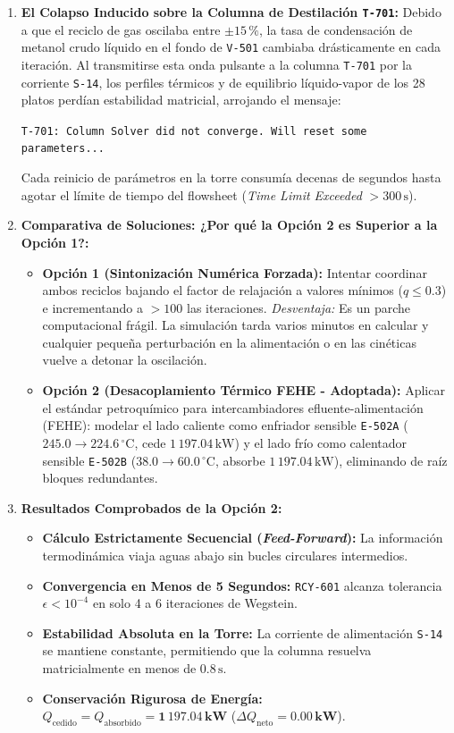 \documentclass[11pt,a4paper]{article}
\begin{document}
\begin{enumerate}
    \item \textbf{El Colapso Inducido sobre la Columna de Destilación \texttt{T-701}:}  
    Debido a que el reciclo de gas oscilaba entre $\pm 15\,\%$, la tasa de condensación de metanol crudo líquido en el fondo de \texttt{V-501} cambiaba drásticamente en cada iteración. Al transmitirse esta onda pulsante a la columna \texttt{T-701} por la corriente \texttt{S-14}, los perfiles térmicos y de equilibrio líquido-vapor de los 28 platos perdían estabilidad matricial, arrojando el mensaje:
    \begin{center}
        \texttt{T-701: Column Solver did not converge. Will reset some parameters...}
    \end{center}
    Cada reinicio de parámetros en la torre consumía decenas de segundos hasta agotar el límite de tiempo del flowsheet (\textit{Time Limit Exceeded} $>300\,\text{s}$).

    \item \textbf{Comparativa de Soluciones: ¿Por qué la Opción 2 es Superior a la Opción 1?:}  
    \begin{itemize}
        \item \textbf{Opción 1 (Sintonización Numérica Forzada):} Intentar coordinar ambos reciclos bajando el factor de relajación a valores mínimos ($q \le 0.3$) e incrementando a $>100$ las iteraciones. \textit{Desventaja:} Es un parche computacional frágil. La simulación tarda varios minutos en calcular y cualquier pequeña perturbación en la alimentación o en las cinéticas vuelve a detonar la oscilación.
        \item \textbf{Opción 2 (Desacoplamiento Térmico FEHE - Adoptada):} Aplicar el estándar petroquímico para intercambiadores efluente-alimentación (FEHE): modelar el lado caliente como enfriador sensible \texttt{E-502A} ($245.0 \to 224.6\,^\circ\text{C}$, cede $1\,197.04\,\text{kW}$) y el lado frío como calentador sensible \texttt{E-502B} ($38.0 \to 60.0\,^\circ\text{C}$, absorbe $1\,197.04\,\text{kW}$), eliminando de raíz bloques redundantes.
    \end{itemize}

    \item \textbf{Resultados Comprobados de la Opción 2:}
    \begin{itemize}
        \item \textbf{Cálculo Estrictamente Secuencial (\textit{Feed-Forward}):} La información termodinámica viaja aguas abajo sin bucles circulares intermedios.
        \item \textbf{Convergencia en Menos de 5 Segundos:} \texttt{RCY-601} alcanza tolerancia $\epsilon < 10^{-4}$ en solo 4 a 6 iteraciones de Wegstein.
        \item \textbf{Estabilidad Absoluta en la Torre:} La corriente de alimentación \texttt{S-14} se mantiene constante, permitiendo que la columna resuelva matricialmente en menos de $0.8\,\text{s}$.
        \item \textbf{Conservación Rigurosa de Energía:} $Q_{\text{cedido}} = Q_{\text{absorbido}} = \mathbf{1\,197.04\,\text{kW}}$ ($\Delta Q_{\text{neto}} = \mathbf{0.00\,\text{kW}}$).
    \end{itemize}
\end{enumerate}
\end{document}
